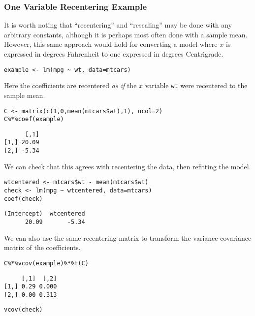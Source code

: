 \documentclass[]{article}
\begin{document}
\subsubsection{One Variable Recentering
Example}\label{one-variable-recentering-example}

It is worth noting that ``recentering'' and ``rescaling'' may be done
with any arbitrary constants, although it is perhaps most often done
with a sample mean. However, this same approach would hold for
converting a model where \(x\) is expressed in degrees Fahrenheit to one
expressed in degrees Centrigrade.

\begin{verbatim}
example <- lm(mpg ~ wt, data=mtcars)
\end{verbatim}

Here the coefficients are recentered \emph{as if} the \(x\) variable
\texttt{wt} were recentered to the sample mean.

\begin{verbatim}
C <- matrix(c(1,0,mean(mtcars$wt),1), ncol=2)
C%*%coef(example)
\end{verbatim}

\begin{verbatim}
      [,1]
[1,] 20.09
[2,] -5.34
\end{verbatim}

We can check that this agrees with recentering the data, then refitting
the model.

\begin{verbatim}
wtcentered <- mtcars$wt - mean(mtcars$wt)
check <- lm(mpg ~ wtcentered, data=mtcars)
coef(check)
\end{verbatim}

\begin{verbatim}
(Intercept)  wtcentered 
      20.09       -5.34 
\end{verbatim}

We can also use the same recentering matrix to transform the
variance-covariance matrix of the coefficients.

\begin{verbatim}
C%*%vcov(example)%*%t(C)
\end{verbatim}

\begin{verbatim}
     [,1]  [,2]
[1,] 0.29 0.000
[2,] 0.00 0.313
\end{verbatim}

\begin{verbatim}
vcov(check)
\end{verbatim}
\end{document}
